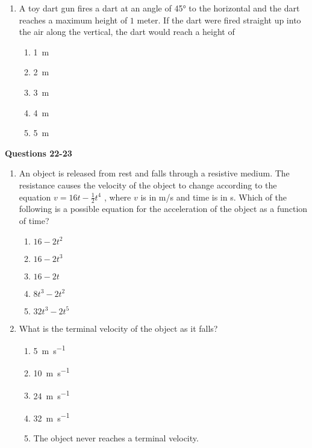 \documentclass{../../oss-apphys}
\begin{document}
\begin{multicols}{2}
\begin{enumerate}[resume,leftmargin=18pt]
  \item A toy dart gun fires a dart at an angle of \ang{45} to the horizontal
    and the dart reaches a maximum height of $1$ meter. If the dart were fired
    straight up into the air along the vertical, the dart would reach a height
    of
    \begin{enumerate}[noitemsep,topsep=0pt,leftmargin=18pt,label=(\Alph*)]
    \item\SI{1}{\metre}
    \item\SI{2}{\metre}
    \item\SI{3}{\metre}
    \item\SI{4}{\metre}
    \item\SI{5}{\metre}
    \end{enumerate}
    
  \end{enumerate}
  
  \textbf{Questions 22-23}
  
  \begin{enumerate}[resume,leftmargin=18pt]
  \item An object is released from rest and falls through a resistive medium.
    The resistance causes the velocity of the object to change according to the
    equation $v=16t-\frac{1}{2}t^4$ , where $v$ is in \si{m/s} and time is in
    \si{\second}. Which of the following is a possible equation for the
    acceleration
    of the object as a function of time?
    \begin{enumerate}[noitemsep,topsep=0pt,leftmargin=18pt,label=(\Alph*)]
    \item $16-2t^2$
    \item $16-2t^3$
    \item $16-2t$
    \item $8t^3-2t^2$
    \item $32t^3-2t^5$
    \end{enumerate}
    
  \item What is the terminal velocity of the object as it falls?
    \begin{enumerate}[noitemsep,topsep=0pt,leftmargin=18pt,label=(\Alph*)]
    \item \SI{5 }{\metre\per\second}
    \item \SI{10}{\metre\per\second}
    \item \SI{24}{\metre\per\second}
    \item \SI{32}{\metre\per\second}
    \item The object never reaches a terminal velocity.
    \end{enumerate}
  

\end{enumerate}
\end{multicols}
\end{document}
